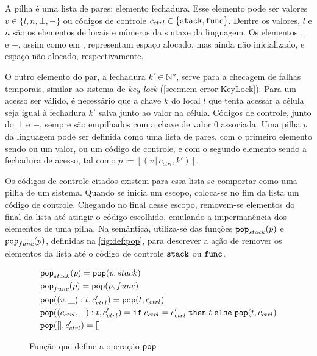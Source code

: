 A pilha é uma lista de pares: elemento fechadura. Esse elemento pode ser valores $v \in \{l, n, \bot, -\}$ ou códigos de controle $c_{ctrl} \in \{\texttt{stack},\texttt{func}\}$. Dentre os valores, $l$ e $n$ são os elementos de locais e números da sintaxe da linguagem. Os elementos $\bot$ e $-$, assim como em \citet{WESSEL2019}, representam espaço alocado, mas ainda não inicializado, e espaço não alocado, respectivamente. 

O outro elemento do par, a fechadura $k' \in \mathbb{N}\text{*}$, serve para a checagem de falhas temporais, similar ao sistema de \emph{key-lock} (\autoref{sec:mem-error:KeyLock}). Para um acesso ser válido, é necessário que a chave $k$ do local $l$ que tenta acessar a célula seja igual à fechadura $k'$ salva junto ao valor na célula. Códigos de controle, junto do $\bot$ e $-$, sempre são empilhados com a chave de valor 0 associada. Uma pilha $p$ da linguagem pode ser definida como uma lista de pares, com o primeiro elemento sendo ou um valor, ou um código de controle, e com o segundo elemento sendo a fechadura de acesso, tal como $p := [(v\,|\,c_{ctrl}, k')]$.

Os códigos de controle citados existem para essa lista se comportar como uma pilha de um sistema. Quando se inicia um escopo, coloca-se no fim da lista um código de controle. Chegando no final desse escopo, removem-se elementos do final da lista até atingir o código escolhido, emulando a impermanência dos elementos de uma pilha. Na semântica, utiliza-se das funções $\texttt{pop}_{stack}(p)$ e $\texttt{pop}_{func}(p)$, definidas na \autoref{fig:def:pop}, para descrever a ação de remover os elementos da lista até o código de controle $\texttt{stack}$ ou $\texttt{func}$. 

\begin{figure}[ht]
	\begin{align}
		&\texttt{pop}_{stack}(p) = \texttt{pop}(p, stack) \label{fig:def:pop1}\\
		&\texttt{pop}_{func}(p) = \texttt{pop}(p, func) \label{fig:def:pop2}\\
		&\texttt{pop}((v, \_) : t, c_{ctrl}') = \texttt{pop}(t, c_{ctrl}) \label{fig:def:pop3}\\
		&\texttt{pop}((c_{ctrl}, \_) : t, c_{ctrl}') = \texttt{if} \; c_{ctrl} = c_{ctrl}' \;\texttt{then} \; t  \; \texttt{else} \; \texttt{pop}(t, c_{ctrl}) \label{fig:def:pop31}\\
		&\texttt{pop}([], c_{ctrl}') =  [] \label{fig:def:pop4}
	\end{align}
	\caption{Função que define a operação $\texttt{pop}$}
	\label{fig:def:pop}
\end{figure}

